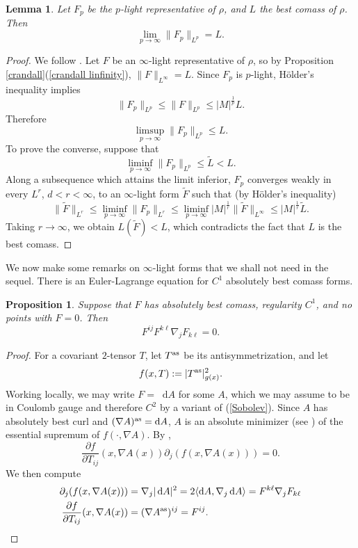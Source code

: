 \documentclass[reqno,11pt]{amsart}
\newcommand*\dif{\mathop{}\!\mathrm{d}}
\newtheorem{lemma}[theorem]{Lemma}
\newtheorem{proposition}[theorem]{Proposition}
\theoremstyle{definition}
\numberwithin{equation}{section}
\begin{document}
\begin{lemma}\label{p lights approximate L}
Let $F_p$ be the $p$-light representative of $\rho$, and $L$ the best comass of $\rho$. Then 
$$\lim_{p \to \infty} \|F_p\|_{L^p} = L.$$
\end{lemma}
\begin{proof}
We follow \cite[Lemma 2.7]{daskalopoulos2020transverse}.
Let $F$ be an $\infty$-light representative of $\rho$, so by Proposition \ref{crandall}(\ref{crandall linfinity}), $\|F\|_{L^\infty} = L$.
Since $F_p$ is $p$-light, H\"older's inequality implies 
$$\|F_p\|_{L^p} \leq \|F\|_{L^p} \leq |M|^{\frac{1}{p}} L.$$
Therefore 
$$\limsup_{p \to \infty} \|F_p\|_{L^p} \leq L.$$
To prove the converse, suppose that 
$$\liminf_{p \to \infty} \|F_p\|_{L^p} \leq \tilde L < L.$$
Along a subsequence which attains the limit inferior, $F_p$ converges weakly in every $L^r$, $d < r < \infty$, to an $\infty$-light form $\tilde F$ such that (by H\"older's inequality)
$$\|\tilde F\|_{L^r} \leq \liminf_{p \to \infty} \|F_p\|_{L^r} \leq \liminf_{p \to \infty} |M|^{\frac{1}{r}} \|\tilde F\|_{L^\infty} \leq |M|^{\frac{1}{r}} \tilde L.$$
Taking $r \to \infty$, we obtain $L(\tilde F) < L$, which contradicts the fact that $L$ is the best comass.
\end{proof}

We now make some remarks on $\infty$-light forms that we shall not need in the sequel.
There is an Euler-Lagrange equation for $C^1$ absolutely best comass forms.

\begin{proposition}
Suppose that $F$ has absolutely best comass, regularity $C^1$, and no points with $F = 0$. Then
\begin{equation}\label{infinityMaxwell}
	F^{ij} F^{k\ell} \nabla_j F_{k \ell} = 0.
\end{equation}
\end{proposition}
\begin{proof}
For a covariant $2$-tensor $T$, let $T^{\rm as}$ be its antisymmetrization, and let
$$f(x, T) := |T^{\rm as}|_{g(x)}^2.$$
Working locally, we may write $F = \dif A$ for some $A$, which we may assume to be in Coulomb gauge and therefore $C^2$ by a variant of (\ref{Sobolev}).
Since $A$ has absolutely best curl and $(\nabla A)^{\rm as} = \dif A$, $A$ is an absolute minimizer (see \cite[Definition 5.1]{Barron2001}) of the essential supremum of $f(\cdot, \nabla A)$.
By \cite[Theorem 5.2]{Barron2001},
\begin{equation}\label{ELA}
	\frac{\partial f}{\partial T_{ij}}(x, \nabla A(x)) \partial_j (f(x, \nabla A(x))) = 0.
\end{equation}
We then compute
\begin{align*}
\partial_j (f(x, \nabla A(x))) &= \nabla_j |\dif A|^2 = 2 \langle \dif A, \nabla_j \dif A\rangle = F^{k\ell} \nabla_j F_{k\ell} \\
\frac{\partial f}{\partial T_{ij}}(x, \nabla A(x)) &= (\nabla A^{\rm as})^{ij} = F^{ij}. \qedhere
\end{align*}
\end{proof}
\end{document}
